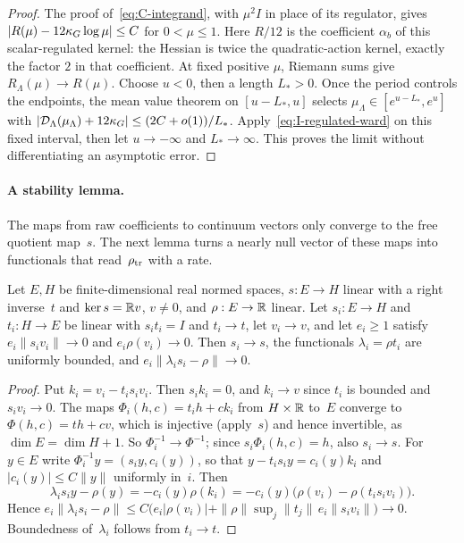 \begin{proof}
The proof of~\eqref{eq:C-integrand}, with $\mu^2I$ in place of its regulator, gives $|R(\mu)-12\kappa_G\log\mu|\le C$ for $0<\mu\le1$. Here $R/12$ is the coefficient $\alpha_b$ of this scalar-regulated kernel: the Hessian is twice the quadratic-action kernel, exactly the factor $2$ in that coefficient. At fixed positive $\mu$, Riemann sums give $R_\Lambda(\mu)\to R(\mu)$. Choose $u<0$, then a length $L_*>0$. Once the period controls the endpoints, the mean value theorem on $[u-L_*,u]$ selects $\mu_\Lambda\in[e^{u-L_*},e^u]$ with $|\mathcal D_\Lambda(\mu_\Lambda)+12\kappa_G|\le(2C+o(1))/L_*$. Apply~\eqref{eq:I-regulated-ward} on this fixed interval, then let $u\to-\infty$ and $L_*\to\infty$. This proves the limit without differentiating an asymptotic error.
\end{proof}

\paragraph{A stability lemma.}
The maps from raw coefficients to continuum vectors only converge to the free quotient map~$s$. The next lemma turns a nearly null vector of these maps into functionals that read~$\rho_{\rm tr}$ with a rate.
\begin{lemma}\label{lem:I-stability}
Let $E,H$ be finite-dimensional real normed spaces, $s:E\to H$ linear with a right inverse~$t$ and $\ker s=\mathbb{R} v$, $v\ne0$, and $\rho:E\to\mathbb{R}$ linear. Let $s_i:E\to H$ and $t_i:H\to E$ be linear with $s_it_i=I$ and $t_i\to t$, let $v_i\to v$, and let $e_i\ge1$ satisfy $e_i\|s_iv_i\|\to0$ and $e_i\rho(v_i)\to0$. Then $s_i\to s$, the functionals $\lambda_i=\rho t_i$ are uniformly bounded, and $e_i\|\lambda_is_i-\rho\|\to0$.
\end{lemma}
\begin{proof}
Put $k_i=v_i-t_is_iv_i$. Then $s_ik_i=0$, and $k_i\to v$ since $t_i$ is bounded and $s_iv_i\to0$. The maps $\Phi_i(h,c)=t_ih+ck_i$ from $H\times\mathbb{R}$ to~$E$ converge to $\Phi(h,c)=th+cv$, which is injective (apply~$s$) and hence invertible, as $\dim E=\dim H+1$. So $\Phi_i^{-1}\to\Phi^{-1}$; since $s_i\Phi_i(h,c)=h$, also $s_i\to s$. For $y\in E$ write $\Phi_i^{-1}y=(s_iy,c_i(y))$, so that $y-t_is_iy=c_i(y)k_i$ and $|c_i(y)|\le C\|y\|$ uniformly in~$i$. Then
\begin{equation*}
\lambda_is_iy-\rho(y)=-c_i(y)\rho(k_i)=-c_i(y)\bigl(\rho(v_i)-\rho(t_is_iv_i)\bigr).
\end{equation*}
Hence $e_i\|\lambda_is_i-\rho\|\le C\bigl(e_i|\rho(v_i)|+\|\rho\|\sup_j\|t_j\|\,e_i\|s_iv_i\|\bigr)\to0$. Boundedness of~$\lambda_i$ follows from $t_i\to t$.
\end{proof}

